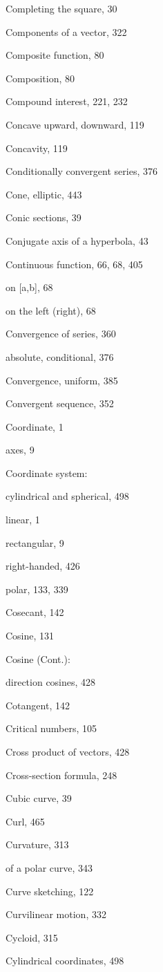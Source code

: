 \documentclass[10pt]{article}
\begin{document}
Completing the square, 30

Components of a vector, 322

Composite function, 80

Composition, 80

Compound interest, 221, 232

Concave upward, downward, 119

Concavity, 119

Conditionally convergent series, 376

Cone, elliptic, 443

Conic sections, 39

Conjugate axis of a hyperbola, 43

Continuous function, 66, 68, 405

on [a,b], 68

on the left (right), 68

Convergence of series, 360

absolute, conditional, 376

Convergence, uniform, 385

Convergent sequence, 352

Coordinate, 1

axes, 9

Coordinate system:

cylindrical and spherical, 498

linear, 1

rectangular, 9

right-handed, 426

polar, 133, 339

Cosecant, 142

Cosine, 131

Cosine (Cont.):

direction cosines, 428

Cotangent, 142

Critical numbers, 105

Cross product of vectors, 428

Cross-section formula, 248

Cubic curve, 39

Curl, 465

Curvature, 313

of a polar curve, 343

Curve sketching, 122

Curvilinear motion, 332

Cycloid, 315

Cylindrical coordinates, 498
\end{document}

